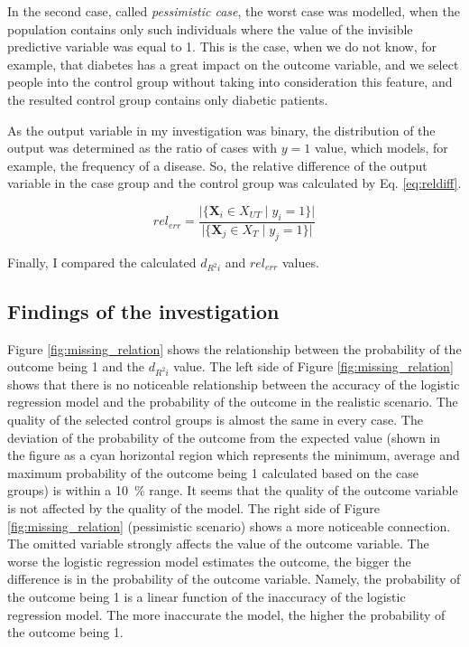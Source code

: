 		In the second case, called \textit{pessimistic case}, the worst case was modelled, when the population contains only such individuals where the value of the invisible predictive variable was equal to 1. This is the case, when we do not know, for example, that diabetes has a great impact on the outcome variable, and we select people into the control group without taking into consideration this feature, and the resulted control group contains only diabetic patients.
								
		As the output variable in my investigation was binary, the distribution of the output was determined as the ratio of cases with $y=1$ value, which models, for example, the frequency of a disease. So, the relative difference of the output variable in the case group and the control group was calculated by Eq. \ref{eq:reldiff}.
				
		\begin{equation}
			rel_{err}= \frac{\lvert\{\textbf{X}_i \in X_{UT} \mid y_i = 1\}\rvert}{\lvert\{\textbf{X}_j \in X_T \mid y_j = 1\}\rvert}
			\label{eq:reldiff}
		\end{equation}
								
		Finally, I compared the calculated $d_{R^{2}i}$ and $rel_{err}$ values.
								
		\subsection{Findings of the investigation}
		\label{res_missing}
								
								
		Figure \ref{fig:missing_relation} shows the relationship between the probability of the outcome being 1 and the $d_{R^{2}i}$ value. The left side of Figure \ref{fig:missing_relation} shows that there is no noticeable relationship between the accuracy of the logistic regression model and the probability of the outcome in the realistic scenario. The quality of the selected control groups is almost the same in every case. The deviation of the probability of the outcome from the expected value (shown in the figure as a cyan horizontal region which represents the minimum, average and maximum probability of the outcome being 1 calculated based on the case groups) is within a \SI{10}{\percent} range. It seems that the quality of the outcome variable is not affected by the quality of the model. The right side of Figure \ref{fig:missing_relation} (pessimistic scenario) shows a more noticeable connection. The omitted variable strongly affects the value of the outcome variable. The worse the logistic regression model estimates the outcome, the bigger the difference is in the probability of the outcome variable. Namely, the probability of the outcome being 1 is a linear function of the inaccuracy of the logistic regression model. The more inaccurate the model, the higher the probability of the outcome being 1.
								
